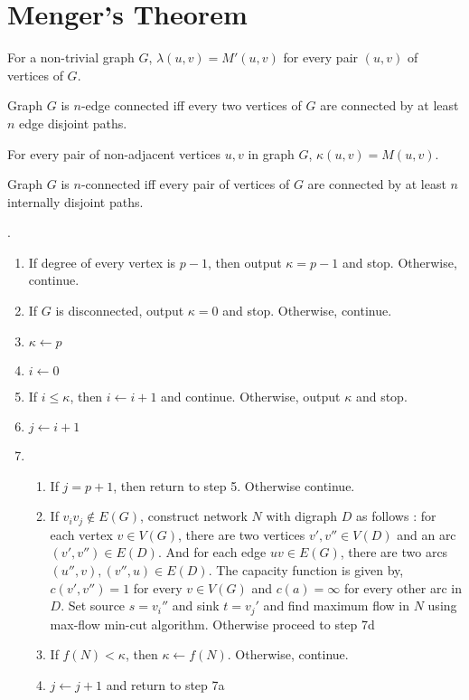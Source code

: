 \section{Menger's Theorem}
\begin{theorem}
	For a non-trivial graph $G$, $\lambda(u,v) = M'(u,v)$ for every pair $(u,v)$ of vertices of $G$.
\end{theorem}
\begin{corollary}
	Graph $G$ is $n$-edge connected iff every two vertices of $G$ are connected by at least $n$ edge disjoint paths.
\end{corollary}
\begin{theorem}
	For every pair of non-adjacent vertices $u,v$ in graph $G$, $\kappa(u,v) = M(u,v)$.
\end{theorem}
\begin{corollary}
	Graph $G$ is $n$-connected iff every pair of vertices of $G$ are connected by at least $n$ internally disjoint paths.
\end{corollary}
\begin{algorithm}.
	\begin{enumerate}
		\item If degree of every vertex is $p-1$, then output $\kappa = p-1$ and stop. Otherwise, continue.
		\item If $G$ is disconnected, output $\kappa = 0$ and stop. Otherwise, continue.
		\item $\kappa \leftarrow p$
		\item $i \leftarrow 0$
		\item If $i \le \kappa$, then $i \leftarrow i+1$ and continue. Otherwise, output $\kappa$ and stop.
		\item $j \leftarrow i+1$
		\item 
			\begin{enumerate}
				\item If $j = p+1$, then return to step 5. Otherwise continue.
				\item If $v_iv_j \not\in E(G)$, construct network $N$ with digraph $D$ as follows : for each vertex $ v \in V(G)$, there are two vertices $v',v'' \in V(D)$ and an arc $(v',v'') \in E(D)$. And for each edge $uv \in E(G)$, there are two arcs $(u'',v),(v'',u) \in E(D)$. The capacity function is given by, $c(v',v'') = 1$ for every $v \in V(G)$ and $c(a) = \infty$ for every other arc in $D$. Set source $s = v_i''$ and sink $t = v_j'$ and find maximum flow in $N$ using max-flow min-cut algorithm. Otherwise proceed to step 7d
				\item If $f(N) < \kappa$, then $\kappa \leftarrow f(N)$. Otherwise, continue.
				\item $j \leftarrow j+1$ and return to step 7a
			\end{enumerate}
	\end{enumerate}
\end{algorithm}


